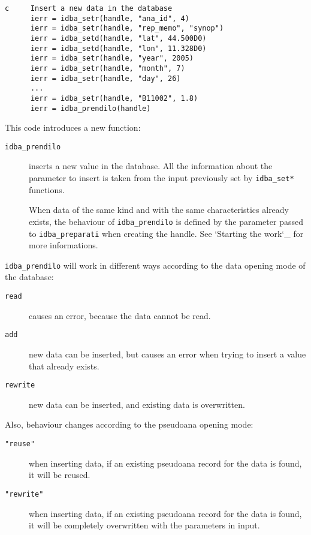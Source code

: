 \documentclass[final,12pt,a4paper,twoside]{book}
\begin{document}
\begin{verbatim}
c     Insert a new data in the database
      ierr = idba_setr(handle, "ana_id", 4)
      ierr = idba_setr(handle, "rep_memo", "synop")
      ierr = idba_setd(handle, "lat", 44.500D0)
      ierr = idba_setd(handle, "lon", 11.328D0)
      ierr = idba_setr(handle, "year", 2005)
      ierr = idba_setr(handle, "month", 7)
      ierr = idba_setr(handle, "day", 26)
      ...
      ierr = idba_setr(handle, "B11002", 1.8)
      ierr = idba_prendilo(handle)
\end{verbatim}

This code introduces a new function:

\begin{description}
\item[{\tt idba\_prendilo}]
  inserts a new value in the database.  All the information about the parameter
  to insert is taken from the input previously set by {\tt idba\_set*} functions.

  When data of the same kind and with the same characteristics already exists,
  the behaviour of {\tt idba\_prendilo} is defined by the parameter passed to
  {\tt idba\_preparati} when creating the handle.  See `Starting the work`\_ for
  more informations.
\end{description}

{\tt idba\_prendilo} will work in different ways according to the data opening
mode of the database:

\begin{description}
\item[{\tt read}]
  causes an error, because the data cannot be read.
\item[{\tt add}]
  new data can be inserted, but causes an error when trying to insert a value
  that already exists.
\item[{\tt rewrite}]
  new data can be inserted, and existing data is overwritten.
\end{description}

Also, behaviour changes according to the pseudoana opening mode:

\begin{description}
\item[{\tt "reuse"}] when inserting data, if an existing pseudoana record for
	       the data is found, it will be reused.
\item[{\tt "rewrite"}] when inserting data, if an existing pseudoana record for
	     the data is found, it will be completely overwritten with
	     the parameters in input.
\end{description}
\end{document}
